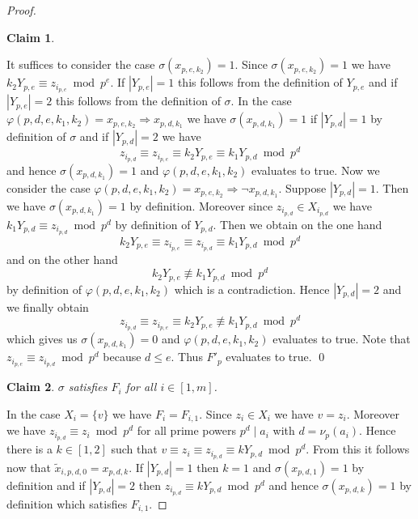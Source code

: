 \documentclass{article}
\newtheorem{claim}{Claim}
\begin{document}
\begin{proof}
\begin{claim}
\end{claim}
It suffices to consider the case $\sigma(x_{p,e,k_2}) = 1$. Since $\sigma(x_{p,e,k_2}) = 1$ we have $k_2Y_{p,e} \equiv z_{i_{p,e}} \bmod p^e$. If $|Y_{p,e}| = 1$ this follows from the definition of $Y_{p,e}$ and if $|Y_{p,e}| = 2$ this follows from the definition of $\sigma$. In the case $\varphi(p,d,e,k_1,k_2) = x_{p,e,k_2} \Rightarrow x_{p,d,k_1}$ we have $\sigma(x_{p,d,k_1}) = 1$ if $|Y_{p,d}| = 1$ by definition of $\sigma$ and if $|Y_{p,d}| = 2$ we have
\begin{displaymath}
z_{i_{p,d}} \equiv z_{i_{p,e}} \equiv k_2Y_{p,e} \equiv k_1Y_{p,d} \bmod p^d
\end{displaymath}
and hence $\sigma(x_{p,d,k_1}) = 1$ and $\varphi(p,d,e,k_1,k_2)$ evaluates to true. Now we consider the case $\varphi(p,d,e,k_1,k_2) = x_{p,e,k_2} \Rightarrow \neg x_{p,d,k_1}$. Suppose $|Y_{p,d}| = 1$. Then we have $\sigma(x_{p,d,k_1}) = 1$ by definition. Moreover since $z_{i_{p,d}} \in X_{i_{p,d}}$ we have $k_1Y_{p,d} \equiv z_{i_{p,d}} \bmod p^d$ by definition of $Y_{p,d}$. Then we obtain on the one hand
\begin{displaymath}
k_2Y_{p,e} \equiv z_{i_{p,e}} \equiv z_{i_{p,d}} \equiv k_1Y_{p,d} \bmod p^d
\end{displaymath}
and on the other hand
\begin{displaymath}
k_2Y_{p,e} \not \equiv k_1Y_{p,d} \bmod p^d
\end{displaymath}
by definition of $\varphi(p,d,e,k_1,k_2)$ which is a contradiction. Hence $|Y_{p,d}| = 2$ and we finally obtain
\begin{displaymath}
z_{i_{p,d}} \equiv z_{i_{p,e}} \equiv k_2Y_{p,e} \not \equiv k_1Y_{p,d} \bmod p^d
\end{displaymath}
which gives us $\sigma(x_{p,d,k_1}) = 0$ and $\varphi(p,d,e,k_1,k_2)$ evaluates to true. Note that $z_{i_{p,e}} \equiv z_{i_{p,d}} \bmod p^d$ because $d \leq e$. Thus $F'_p$ evaluates to true.
\qed
\begin{claim}\label{claimsigmasatFi}
$\sigma$ satisfies $F_i$ for all $i \in [1,m]$.
\end{claim}
In the case $X_i = \{v\}$ we have $F_i = F_{i,1}$. Since $z_i \in X_i$ we have $v = z_i$. Moreover we have $z_{i_{p,d}} \equiv z_i \bmod p^d$ for all prime powers $p^d \mid a_i$ with $d = \nu_p(a_i)$. Hence there is a $k \in [1,2]$ such that $v \equiv z_i \equiv z_{i_{p,d}} \equiv kY_{p,d} \bmod p^d$. From this it follows now that $\tilde{x}_{i,p,d,0} = x_{p,d,k}$. If $|Y_{p,d}| = 1$ then $k=1$ and $\sigma(x_{p,d,1}) = 1$ by definition and if $|Y_{p,d}| = 2$ then $z_{i_{p,d}} \equiv kY_{p,d} \bmod p^d$ and hence $\sigma(x_{p,d,k}) = 1$ by definition which satisfies $F_{i,1}$.


\end{proof}
\end{document}
